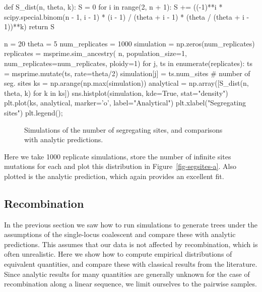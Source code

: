 \documentclass[graybox]{svmult}
\begin{document}
\begin{pythoncode}
def S_dist(n, theta, k):
    S = 0
    for i in range(2, n + 1):
        S += ((-1)**i * scipy.special.binom(n - 1, i - 1)
            * (i - 1) / (theta + i - 1)
            * (theta / (theta + i - 1))**k)
    return S

n = 20
theta = 5
num_replicates = 1000
simulation = np.zeros(num_replicates)
replicates = msprime.sim_ancestry(
    n, population_size=1, num_replicates=num_replicates, ploidy=1)
for j, ts in enumerate(replicates):
    ts = msprime.mutate(ts, rate=theta/2)
    simulation[j] = ts.num_sites  # number of seg. sites
ks = np.arange(np.max(simulation))
analytical = np.array([S_dist(n, theta, k) for k in ks])
sns.histplot(simulation, kde=True, stat="density")
plt.plot(ks, analytical, marker='o', label="Analytical")
plt.xlabel("Segregating sites")
plt.legend();
\end{pythoncode}

\begin{figure}[t]
\centering
{}
\qquad\qquad
{}
\caption{\label{fig-segsites}
Simulations of the number of segregating sites, and
comparisons with analytic predictions.
}
\end{figure}

Here we take 1000 replicate simulations, store the number of infinite
sites mutations for each and plot this distribution in
Figure~\ref{fig-segsites-a}. Also plotted is the analytic prediction, which again provides an excellent fit.


\subsection{Recombination}

In the previous section we saw how to run simulations to generate trees
under the assumptions of the single-locus coalescent and compare these
with analytic predictions. This assumes that our data is not affected
by recombination, which is often unrealistic. Here we show how to
compute empirical distributions of equivalent quantities, and compare
these with classical results from the literature. Since analytic
results for many quantities are generally unknown for the case of recombination along a linear sequence, we limit ourselves to the pairwise samples.
\end{document}

